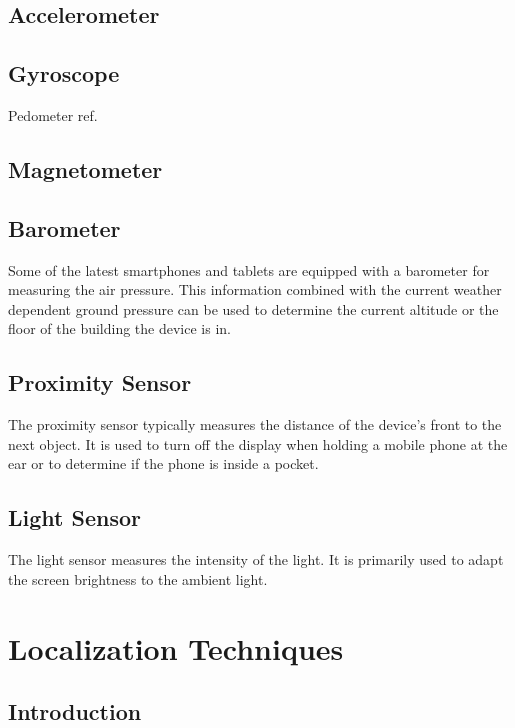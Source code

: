 \subsection*{Accelerometer}

\subsection*{Gyroscope}

Pedometer ref.

\subsection*{Magnetometer}

\subsection*{Barometer}

Some of the latest smartphones and tablets are equipped with a barometer for measuring the air pressure. This information combined with the current weather dependent ground pressure can be used to determine the current altitude or the floor of the building the device is in. 

\subsection*{Proximity Sensor}

The proximity sensor typically measures the distance of the device's front to the next object. It is used to turn off the display when holding a mobile phone at the ear or to determine if the phone is inside a pocket.

\subsection*{Light Sensor}

The light sensor measures the intensity of the light. It is primarily used to adapt the screen brightness to the ambient light.

\section{Localization Techniques}

\subsection{Introduction}

